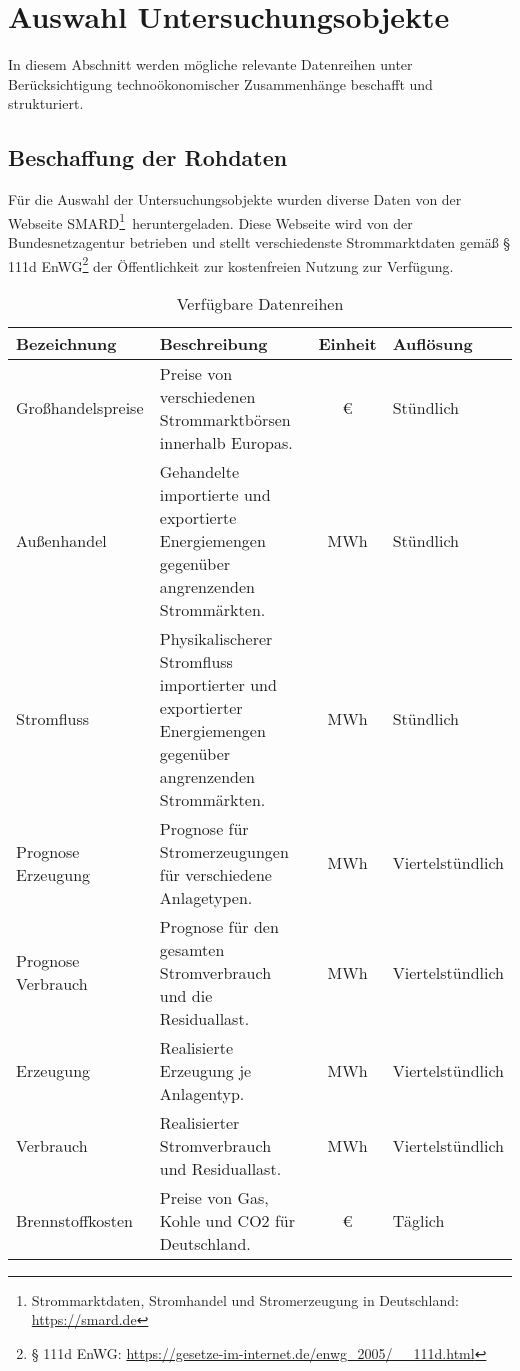 \section{Auswahl Untersuchungsobjekte}
In diesem Abschnitt werden mögliche relevante Datenreihen unter Berücksichtigung technoökonomischer Zusammenhänge beschafft und strukturiert.

\subsection{Beschaffung der Rohdaten}
Für die Auswahl der Untersuchungsobjekte wurden diverse Daten von der Webseite SMARD\footnote{Strommarktdaten, Stromhandel und Stromerzeugung in Deutschland: \url{https://smard.de}} heruntergeladen. Diese Webseite wird von der Bundesnetzagentur betrieben und stellt verschiedenste Strommarktdaten gemäß § 111d EnWG\footnote{§ 111d EnWG: \url{https://gesetze-im-internet.de/enwg_2005/__111d.html}} der Öffentlichkeit zur kostenfreien Nutzung zur Verfügung.

\begin{table}[h]
  \centering
  \begin{tabularx}{\textwidth}{|l|X|c|l|}
    \hline

    \textbf{Bezeichnung} & \textbf{Beschreibung} & \textbf{Einheit} & \textbf{Auflösung} \\ \hline
    
    Großhandelspreise & Preise von verschiedenen Strommarktbörsen innerhalb Europas. & € & Stündlich \\ \hline

    Außenhandel & Gehandelte importierte und exportierte Energiemengen gegenüber angrenzenden Strommärkten. & MWh & Stündlich \\ \hline

    Stromfluss & Physikalischerer Stromfluss importierter und exportierter Energiemengen gegenüber angrenzenden Strommärkten. & MWh & Stündlich \\ \hline

    Prognose Erzeugung & Prognose für Stromerzeugungen für verschiedene Anlagetypen. & MWh & Viertelstündlich \\ \hline

    Prognose Verbrauch & Prognose für den gesamten Stromverbrauch und die Residuallast. & MWh & Viertelstündlich \\ \hline

    Erzeugung & Realisierte Erzeugung je Anlagentyp. & MWh & Viertelstündlich \\ \hline

    Verbrauch & Realisierter Stromverbrauch und Residuallast. & MWh & Viertelstündlich \\ \hline

    Brennstoffkosten & Preise von Gas, Kohle und CO2 für Deutschland. & € & Täglich \\ \hline
  \end{tabularx}
  \caption{Verfügbare Datenreihen}
\end{table}


